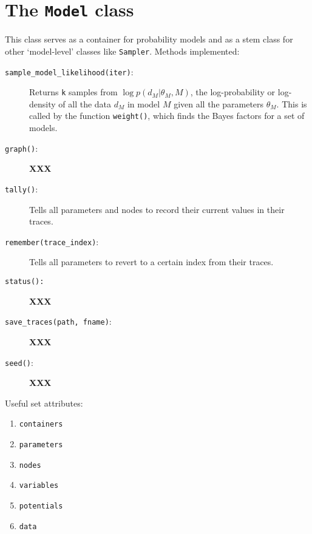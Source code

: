 \section{The \texttt{Model} class} \label{sec:Model}
This class serves as a container for probability models and as a stem class for other `model-level' classes like \texttt{Sampler}. Methods implemented:
\begin{description}
    \item[\texttt{sample\_model\_likelihood(\texttt{iter})}:] Returns \texttt{k} samples from $\log p(d_M|\theta_M, M)$, the log-probability or log-density of all the data $d_M$ in model $M$ given all the parameters $\theta_M$. This is called by the function \texttt{weight()}, which finds the Bayes factors for a set of models.
    \item[\texttt{graph()}:] \textbf{XXX}
    \item[\texttt{tally()}:] Tells all parameters and nodes to record their current values in their traces.
    \item[\texttt{remember(trace\_index)}:] Tells all parameters to revert to a certain index from their traces.
    \item[\texttt{status():}] \textbf{XXX}
    \item[\texttt{save\_traces(path, fname)}:] \textbf{XXX}
    \item[\texttt{seed()}:] \textbf{XXX}
\end{description}

Useful set attributes:
\begin{enumerate}
    \item \texttt{containers}
    \item \texttt{parameters}
    \item \texttt{nodes}
    \item \texttt{variables}
    \item \texttt{potentials}
    \item \texttt{data}
\end{enumerate}



